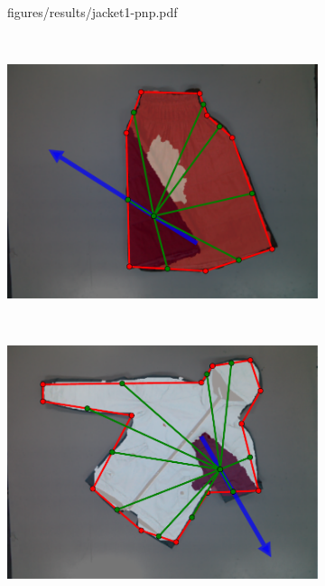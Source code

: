 \begin{figure}[htbp]
\begin{subfigure}[r]{\bigtablewidth}
    	{figures/results/jacket1-pnp.pdf}
	\end{subfigure}
	~
    \begin{subfigure}[l]{\bigtablewidth}
	    \centering
    	\includegraphics[width=\textwidth]
    	{figures/results/skirt7-pnp.pdf}
	\end{subfigure}
	~
    \begin{subfigure}[r]{\bigtablewidth}
	    \centering
    	\includegraphics[width=\textwidth]
    	{figures/results/jacket2-pnp.pdf}
	\end{subfigure}
	~
    \begin{subfigure}[l]{\bigtablewidth}
	    \centering

\end{subfigure}
\end{figure}
